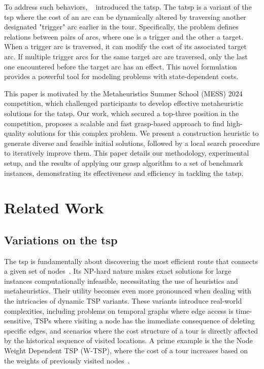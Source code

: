 \documentclass[twocolumn, switch]{article} %
\begin{document}
To address such behaviors, ~\citet{Cerrone} introduced the \gls{tatsp}. 
The \gls{tatsp} is a variant of the \gls{tsp} where the cost of an arc can be dynamically altered by traversing another designated "trigger" arc earlier in the tour. 
Specifically, the problem defines relations between pairs of arcs, where one is a trigger and the other a target. 
When a trigger arc is traversed, it can modify the cost of its associated target arc. 
If multiple trigger arcs for the same target arc are traversed, only the last one encountered before the target arc has an effect. 
This novel formulation provides a powerful tool for modeling problems with state-dependent costs. 

This paper is motivated by the Metaheuristics Summer School (MESS) 2024 competition, which challenged participants to develop effective metaheuristic solutions for the \gls{tatsp}. 
Our work, which secured a top-three position in the competition, proposes a scalable and fast \gls{grasp}-based approach to find high-quality solutions for this complex problem. 
We present a construction heuristic to generate diverse and feasible initial solutions, followed by a local search procedure to iteratively improve them. 
This paper details our methodology, experimental setup, and the results of applying our \gls{grasp} algorithm to a set of benchmark instances, demonstrating its effectiveness and efficiency in tackling the \gls{tatsp}. 

\section{Related Work}
\label{sec:related_work}

\subsection{Variations on the \gls{tsp}}

The \gls{tsp} is fundamentally about discovering the most efficient route that connects a given set of nodes~\cite{Reinelt2003}. 
Its NP-hard nature makes exact solutions for large instances computationally infeasible, necessitating the use of heuristics and metaheuristics.
Their utility becomes even more pronounced when dealing with the intricacies of dynamic TSP variants. These variants introduce 
real-world complexities, including problems on temporal graphs where edge access is time-sensitive, TSPs where visiting a node 
has the immediate consequence of deleting specific edges, and scenarios where the cost structure of a tour is directly affected 
by the historical sequence of visited locations. A prime example is the the Node Weight Dependent TSP (W-TSP), where the cost of a 
tour increases based on the weights of previously visited nodes~\cite{Bossek2020}.
\end{document}
